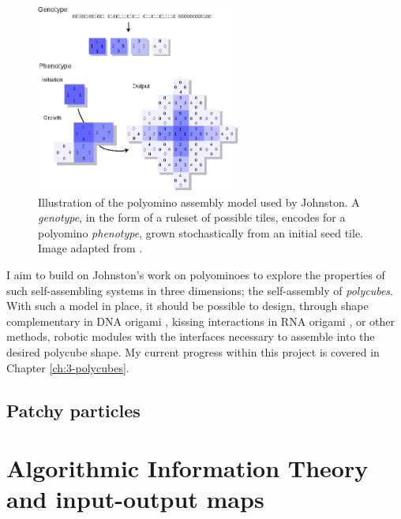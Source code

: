 \begin{figure}[h]
    \centering\includegraphics[width=0.6\textwidth]{figures/polyominoes.eps}
    \caption{Illustration of the polyomino assembly model used by Johnston. A \emph{genotype}, in the form of a ruleset of possible tiles, encodes for a polyomino \emph{phenotype}, grown stochastically from an initial seed tile. Image adapted from \cite{johnston2011evolutionary}.}
    \label{fig:polyominoes}
\end{figure}

I aim to build on Johnston's work on polyominoes to explore the properties of such self-assembling systems in three dimensions; the self-assembly of \emph{polycubes}. With such a model in place, it should be possible to design, through shape complementary in DNA origami \cite{wagenbauer2017gigadalton}, kissing interactions in RNA origami \cite{geary2014single}, or other methods, robotic modules with the interfaces necessary to assemble into the desired polycube shape. My current progress within this project is covered in Chapter \ref{ch:3-polycubes}.

\subsection{Patchy particles}

\section{Algorithmic Information Theory and input-output maps}



